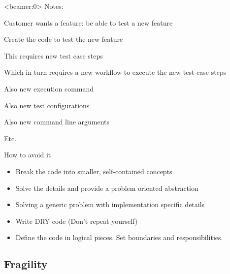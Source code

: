 \documentclass[xcolor=svgnames]{beamer}
\begin{document}
{%
%
\begin{frame}<beamer:0>{\subsecname}
    Notes:\par
    Customer wants a feature: be able to test a new feature\par
    Create the code to test the new feature\par
    This requires new test case steps\par
    Which in turn requires a new workflow to execute the new test case steps\par
    Also new execution command\par
    Also new test configurations\par
    Also new command line arguments\par
    Etc.\par
\end{frame}
}


{%
%
\begin{frame}{\subsecname}

    How to avoid it
    \begin{itemize}
        \pause \item Break the code into smaller, self-contained concepts
        \pause \item Solve the details and provide a problem oriented abstraction
        \pause \item Solving a generic problem with implementation specific details
        \pause \item Write DRY code (Don't repeat yourself)
        \pause \item Define the code in logical pieces.  Set boundaries and
            responsibilities.
    \end{itemize}
\end{frame}
}


\subsection{Fragility}
\end{document}
